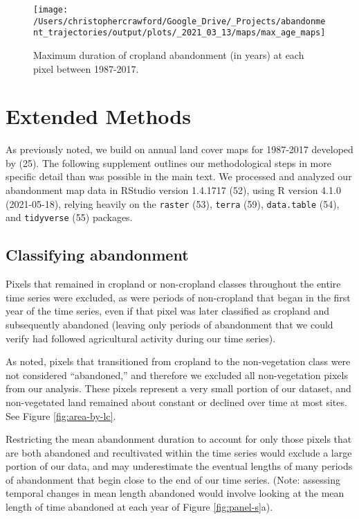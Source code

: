 \documentclass[9pt,twocolumn,twoside,]{pnas-new}
\begin{document}
\begin{figure}
\texttt{[image: /Users/christophercrawford/Google\_Drive/\_Projects/abandonment\_trajectories/output/plots/\_2021\_03\_13/maps/max\_age\_maps]} \caption{Maximum duration of cropland abandonment (in years) at each pixel between 1987-2017.}\label{fig:map-abn-age-max}
\end{figure}

\newpage

\hypertarget{methods-si}{%
\section{Extended Methods}\label{methods-si}}

As previously noted, we build on annual land cover maps for 1987-2017 developed by (25).
The following supplement outlines our methodological steps in more specific detail than was possible in the main text.
We processed and analyzed our abandonment map data in RStudio version 1.4.1717 (52), using R version 4.1.0 (2021-05-18), relying heavily on the \texttt{raster} (53), \texttt{terra} (59), \texttt{data.table} (54), and \texttt{tidyverse} (55) packages.

\hypertarget{classifying-abandonment}{%
\subsection{Classifying abandonment}\label{classifying-abandonment}}

Pixels that remained in cropland or non-cropland classes throughout the entire time series were excluded, as were periods of non-cropland that began in the first year of the time series, even if that pixel was later classified as cropland and subsequently abandoned (leaving only periods of abandonment that we could verify had followed agricultural activity during our time series).

As noted, pixels that transitioned from cropland to the non-vegetation class were not considered ``abandoned,'' and therefore we excluded all non-vegetation pixels from our analysis.
These pixels represent a very small portion of our dataset, and non-vegetated land remained about constant or declined over time at most sites.
See Figure \ref{fig:area-by-lc}.

Restricting the mean abandonment duration to account for only those pixels that are both abandoned and recultivated within the time series would exclude a large portion of our data, and may underestimate the eventual lengths of many periods of abandonment that begin close to the end of our time series.
(Note: assessing temporal changes in mean length abandoned would involve looking at the mean length of time abandoned at each year of Figure \ref{fig:panel-s}a).
\end{document}
